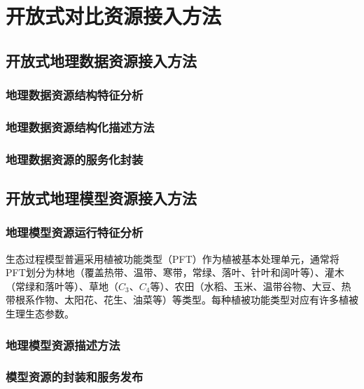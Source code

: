 \chapter{开放式对比资源接入方法}
\section{开放式地理数据资源接入方法}
\subsection{地理数据资源结构特征分析}
\subsection{地理数据资源结构化描述方法}
\subsection{地理数据资源的服务化封装}

\section{开放式地理模型资源接入方法}

\subsection{地理模型资源运行特征分析}
生态过程模型普遍采用植被功能类型（PFT）作为植被基本处理单元，通常将PFT划分为林地（覆盖热带、温带、寒带，常绿、落叶、针叶和阔叶等）、灌木（常绿和落叶等）、草地（$C_3$、$C_4$等）、农田（水稻、玉米、温带谷物、大豆、热带根系作物、太阳花、花生、油菜等）等类型。每种植被功能类型对应有许多植被生理生态参数。

\subsection{地理模型资源描述方法}
\subsection{模型资源的封装和服务发布}


